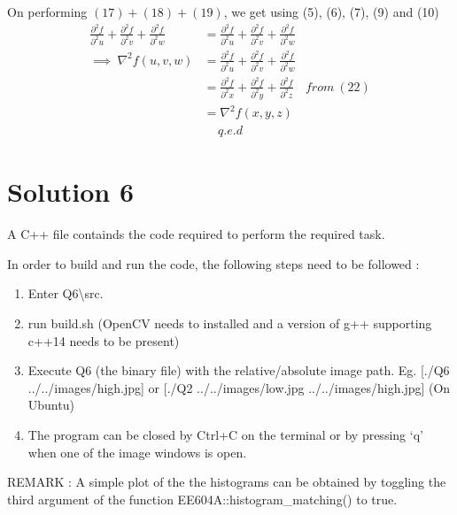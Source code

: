 \documentclass[a4paper,fleqn,11pt]{article}
\theoremstyle{mytheor}
\begin{document}
On performing $(17) + (18) + (19)$, we get using (5), (6), (7), (9) and (10)
\begin{align}
\frac{\partial^2 f}{\partial^2 u} +
\frac{\partial^2 f}{\partial^2 v} +
\frac{\partial^2 f}{\partial^2 w} & =
\frac{\partial^2 f}{\partial^2 u} +
\frac{\partial^2 f}{\partial^2 v} +
\frac{\partial^2 f}{\partial^2 w}\\
\implies\ \nabla^2 f(u, v, w) & = \frac{\partial^2 f}{\partial^2 u} +
							  \frac{\partial^2 f}{\partial^2 v} +
						      \frac{\partial^2 f}{\partial^2 w} \\
						      & = \frac{\partial^2 f}{\partial^2 x} +
							  \frac{\partial^2 f}{\partial^2 y} +
						      \frac{\partial^2 f}{\partial^2 z} & from\ (22) \\
						      & =  \nabla^2 f(x, y, z)
\end{align}
\begin{align*}
q.e.d
\end{align*}
\section*{Solution 6}

A C++ file containds the code required to perform the required task.

In order to build and run the code, the following steps need to be followed :
\begin{enumerate}
\item Enter Q6\textbackslash src.
\item run build.sh (OpenCV needs to installed and a version of g++ supporting c++14 needs to be present)
\item Execute Q6 (the binary file) with the relative/absolute image path. Eg. [./Q6 ../../images/high.jpg] or [./Q2 ../../images/low.jpg ../../images/high.jpg] (On Ubuntu)
\item The program can be closed by Ctrl+C on the terminal or by pressing `q' when one of the image windows is open.
\end{enumerate}
REMARK : A simple plot of the the histograms can be obtained by toggling the third argument of the function EE604A::histogram\_matching() to true.
\end{document}
